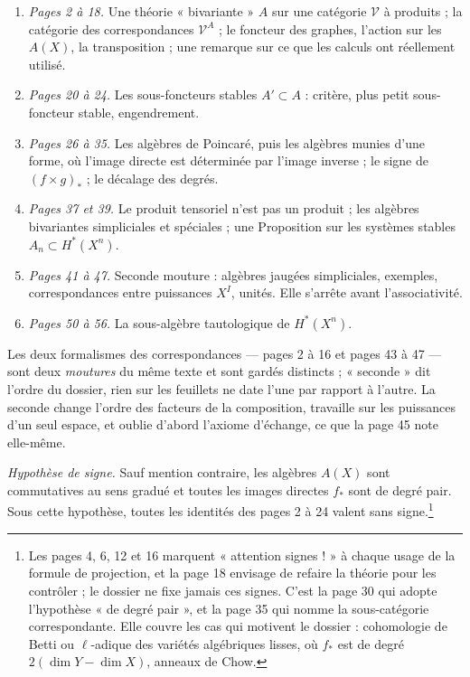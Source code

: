 \documentclass[11pt,a4paper]{article}
\begin{document}
\begin{enumerate}
  \item \emph{Pages 2 à 18.} Une théorie « bivariante » $A$ sur une catégorie
  $\mathcal{V}$ à produits ; la catégorie des correspondances
  $\mathcal{V}^{A}$ ; le foncteur des graphes, l'action sur les $A(X)$, la
  transposition ; une remarque sur ce que les calculs ont réellement utilisé.
  \item \emph{Pages 20 à 24.} Les sous-foncteurs stables $A' \subset A$ :
  critère, plus petit sous-foncteur stable, engendrement.
  \item \emph{Pages 26 à 35.} Les algèbres de Poincaré, puis les algèbres
  munies d'une forme, où l'image directe est déterminée par l'image inverse ;
  le signe de $(f \times g)_{*}$ ; le décalage des degrés.
  \item \emph{Pages 37 et 39.} Le produit tensoriel n'est pas un produit ; les
  algèbres bivariantes simpliciales et spéciales ; une Proposition sur les
  systèmes stables $A_{n} \subset H^{*}(X^{n})$.
  \item \emph{Pages 41 à 47.} Seconde mouture : algèbres jaugées simpliciales,
  exemples, correspondances entre puissances $X^{I}$, unités. Elle s'arrête
  avant l'associativité.
  \item \emph{Pages 50 à 56.} La sous-algèbre tautologique de
  $H^{*}(X^{n})$.
\end{enumerate}

Les deux formalismes des correspondances --- pages 2 à 16 et pages 43 à 47 ---
sont deux \emph{moutures} du même texte et sont gardés distincts ; « seconde »
dit l'ordre du dossier, rien sur les feuillets ne date l'une par rapport à
l'autre. La seconde
change l'ordre des facteurs de la composition, travaille sur les puissances
d'un seul espace, et oublie d'abord l'axiome d'échange, ce que la page 45 note
elle-même.

\emph{Hypothèse de signe.} Sauf mention contraire, les algèbres $A(X)$ sont
commutatives au sens gradué et toutes les images directes $f_{*}$ sont de
degré pair. Sous cette hypothèse, toutes les identités des pages 2 à 24
valent sans signe.\footnote{Les pages 4, 6, 12 et 16 marquent « attention
signes ! » à chaque usage de la formule de projection, et la page 18 envisage
de refaire la théorie pour les contrôler ; le dossier ne fixe jamais ces
signes. C'est la page 30 qui adopte l'hypothèse « de degré pair », et la page
35 qui nomme la sous-catégorie correspondante. Elle couvre les cas qui motivent
le dossier : cohomologie de Betti ou $\ell$-adique des variétés algébriques
lisses, où $f_{*}$ est de degré $2(\dim Y - \dim X)$, anneaux de Chow.}
\end{document}
